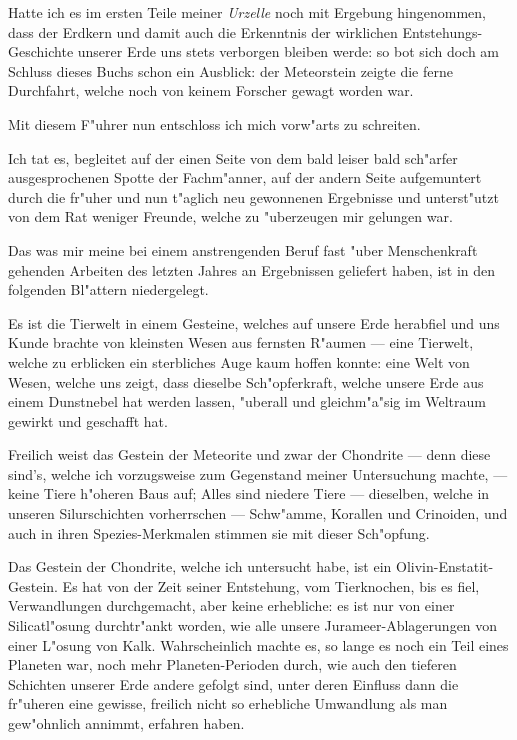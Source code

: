 \documentclass[a4paper, 11pt, oneside]{article}
\begin{document}
Hatte ich es im ersten Teile meiner \emph{Urzelle} noch mit Ergebung hingenommen, dass der Erdkern und damit auch die Erkenntnis der wirklichen Entstehungs-Geschichte unserer Erde uns stets verborgen bleiben werde: so bot sich doch am Schluss dieses Buchs schon ein Ausblick: der Meteorstein zeigte die ferne Durchfahrt, welche noch von keinem Forscher gewagt worden war.

Mit diesem F"uhrer nun entschloss ich mich vorw"arts zu schreiten.

Ich tat es, begleitet auf der einen Seite von dem bald leiser bald sch"arfer ausgesprochenen Spotte der Fachm"anner, auf der andern Seite aufgemuntert durch die fr"uher und nun t"aglich neu gewonnenen Ergebnisse und unterst"utzt von dem Rat weniger Freunde, welche zu "uberzeugen mir gelungen war.

Das was mir meine bei einem anstrengenden Beruf fast "uber Menschenkraft gehenden Arbeiten des letzten Jahres an Ergebnissen geliefert haben, ist in den folgenden Bl"attern niedergelegt.

Es ist die Tierwelt in einem Gesteine, welches auf unsere Erde herabfiel und uns Kunde brachte von kleinsten Wesen aus fernsten R"aumen --- eine Tierwelt, welche zu erblicken ein sterbliches Auge kaum hoffen konnte: eine Welt von Wesen, welche uns zeigt, dass dieselbe Sch"opferkraft, welche unsere Erde aus einem Dunstnebel hat werden lassen, "uberall und gleichm"a"sig im Weltraum gewirkt und geschafft hat.

Freilich weist das Gestein der Meteorite und zwar der Chondrite --- denn diese sind's, welche ich vorzugsweise zum Gegenstand meiner Untersuchung machte, --- keine Tiere h"oheren Baus auf; Alles sind niedere Tiere --- dieselben, welche in unseren Silurschichten vorherrschen --- Schw"amme, Korallen und Crinoiden, und auch in ihren Spezies-Merkmalen stimmen sie mit dieser Sch"opfung.

Das Gestein der Chondrite, welche ich untersucht habe, ist ein Olivin-Enstatit-Gestein. Es hat von der Zeit seiner Entstehung, vom Tierknochen, bis es fiel, Verwandlungen durchgemacht, aber keine erhebliche: es ist nur von einer Silicatl"osung durchtr"ankt worden, wie alle unsere Jurameer-Ablagerungen von einer L"osung von Kalk. Wahrscheinlich machte es, so lange es noch ein Teil eines Planeten war, noch mehr Planeten-Perioden durch, wie auch den tieferen Schichten unserer Erde andere gefolgt sind, unter deren Einfluss dann die fr"uheren eine gewisse, freilich nicht so erhebliche Umwandlung als man gew"ohnlich annimmt, erfahren haben.
\end{document}
